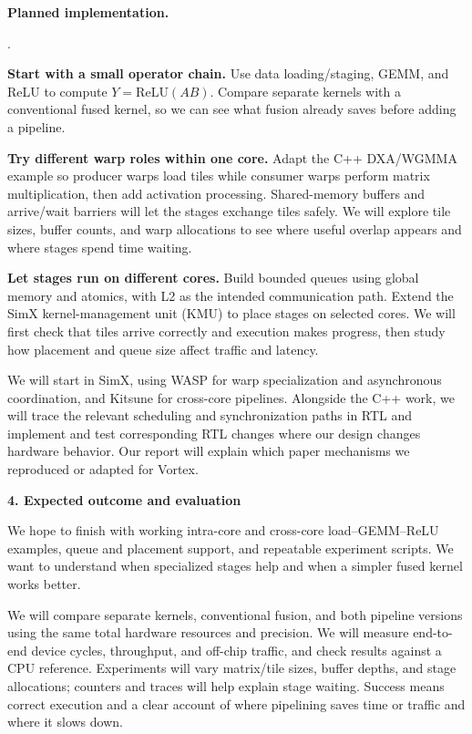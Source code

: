 \documentclass[11pt,letterpaper]{article}
\newcommand{\proposalheading}[1]{%
  \par\addvspace{0.55em}\noindent\textbf{#1}\par\nobreak\vspace{0.08em}}
\newenvironment{compactitems}{%
  \begin{list}{\arabic{enumi}.}{\usecounter{enumi}%
  \setlength{\itemsep}{0.18em}\setlength{\topsep}{0.2em}%
  \setlength{\partopsep}{0pt}\setlength{\parsep}{0pt}}%
}{\end{list}}
\begin{document}
\textbf{Planned implementation.}
\begin{compactitems}
\item \textbf{Start with a small operator chain.}
Use data loading/staging, GEMM, and ReLU to compute $Y=\mathrm{ReLU}(AB)$.
Compare separate kernels with a conventional fused kernel, so we can see what
fusion already saves before adding a pipeline.
\item \textbf{Try different warp roles within one core.}
Adapt the C++ DXA/WGMMA example so producer warps load tiles while consumer warps
perform matrix multiplication, then add activation processing. Shared-memory
buffers and arrive/wait barriers will let the stages exchange tiles safely.
We will explore tile sizes, buffer counts, and warp allocations to see where
useful overlap appears and where stages spend time waiting.
\item \textbf{Let stages run on different cores.}
Build bounded queues using global memory and atomics, with L2 as the intended
communication path. Extend the SimX kernel-management unit (KMU) to place stages
on selected cores. We will first check that tiles arrive correctly and execution
makes progress, then study how placement and queue size affect traffic and latency.
\end{compactitems}
We will start in SimX, using WASP for warp specialization and asynchronous
coordination, and Kitsune for cross-core pipelines. Alongside the C++ work, we will
trace the relevant scheduling and synchronization paths in RTL and implement and
test corresponding RTL changes where our design changes hardware behavior.
Our report will explain which paper mechanisms we reproduced or adapted for Vortex.

\newpage

\proposalheading{4. Expected outcome and evaluation}
We hope to finish with working intra-core and cross-core load--GEMM--ReLU examples,
queue and placement support, and repeatable experiment scripts. We want to understand
when specialized stages help and when a simpler fused kernel works better.

We will compare separate kernels, conventional fusion, and both pipeline versions
using the same total hardware resources and precision. We will measure end-to-end
device cycles, throughput, and off-chip traffic, and check results against a CPU
reference. Experiments will vary matrix/tile sizes, buffer depths, and stage allocations;
counters and traces will help explain stage waiting. Success means correct execution
and a clear account of where pipelining saves time or traffic and where it slows down.
\end{document}
